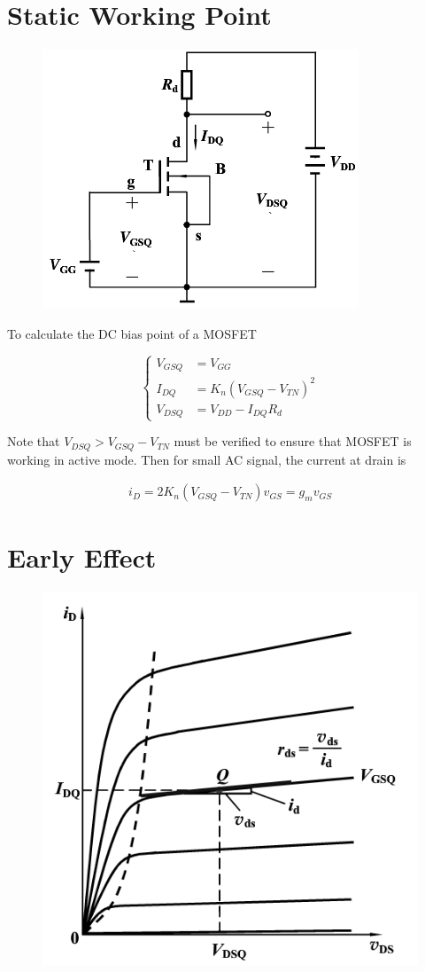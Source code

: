 \section{Static Working Point}

\begin{figure}[H]
  \centering
  \includegraphics[width=0.5\linewidth]{figures/MOSFET-Static}
\end{figure}

To calculate the DC bias point of a MOSFET

\begin{equation*}
  \left\{
  \begin{aligned}
    V_{GSQ} &= V_{GG} \\
    I_{DQ} &= K_n \left( V_{GSQ} - V_{TN} \right)^2 \\
    V_{DSQ} &= V_{DD} - I_{DQ} R_d
  \end{aligned}
  \right.
\end{equation*}

Note that $V_{DSQ} > V_{GSQ} - V_{TN}$ must be verified to ensure that MOSFET is working in active mode. Then for small AC signal, the current at drain is

\begin{equation*}
  \begin{aligned}
    i_D = 2 K_n \left( V_{GSQ} - V_{TN} \right) v_{GS} = g_m v_{GS}
  \end{aligned}
\end{equation*}

\section{Early Effect}

\begin{figure}[H]
  \centering
  \includegraphics[width=0.5\linewidth]{figures/MOSFET-Early-Effect}
\end{figure}


